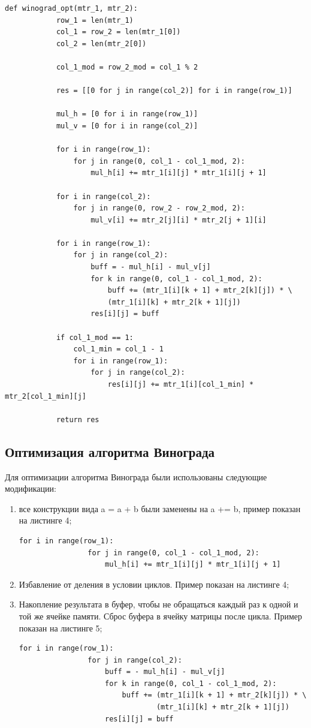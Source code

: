 \documentclass[a4paper, 14pt]{article}
\begin{document}
		\begin{lstlisting}[label=some-code,caption=Оптимизированный алгоритм Винограда]
		def winograd_opt(mtr_1, mtr_2):
    		row_1 = len(mtr_1)
    		col_1 = row_2 = len(mtr_1[0])
    		col_2 = len(mtr_2[0])

    		col_1_mod = row_2_mod = col_1 % 2

    		res = [[0 for j in range(col_2)] for i in range(row_1)]

    		mul_h = [0 for i in range(row_1)]
    		mul_v = [0 for i in range(col_2)]

    		for i in range(row_1):
        		for j in range(0, col_1 - col_1_mod, 2):
            		mul_h[i] += mtr_1[i][j] * mtr_1[i][j + 1]

    		for i in range(col_2):
        		for j in range(0, row_2 - row_2_mod, 2):
            		mul_v[i] += mtr_2[j][i] * mtr_2[j + 1][i]

    		for i in range(row_1):
        		for j in range(col_2):
            		buff = - mul_h[i] - mul_v[j]
            		for k in range(0, col_1 - col_1_mod, 2):
                		buff += (mtr_1[i][k + 1] + mtr_2[k][j]) * \
                        (mtr_1[i][k] + mtr_2[k + 1][j])
            		res[i][j] = buff

    		if col_1_mod == 1:
        		col_1_min = col_1 - 1
        		for i in range(row_1):
            		for j in range(col_2):
                		res[i][j] += mtr_1[i][col_1_min] * mtr_2[col_1_min][j]

    		return res
		\end{lstlisting}
        \subsection{Оптимизация алгоритма Винограда}
        \parindent=1cm
        Для оптимизации алгоритма Винограда были использованы следующие модификации:
        \begin{enumerate}
        	\item все конструкции вида a = a + b были заменены на a += b, пример показан на листинге 4;
		\begin{lstlisting}[label=some-code,caption=Оптимизация 1 и 2]
			for i in range(row_1):
        		for j in range(0, col_1 - col_1_mod, 2):
            		mul_h[i] += mtr_1[i][j] * mtr_1[i][j + 1]
		\end{lstlisting}   
			\item Избавление от деления в условии циклов. Пример показан на листинге 4; 
			\item Накопление результата в буфер, чтобы не обращаться каждый раз к одной и той же ячейке памяти. Сброс буфера в ячейку матрицы после цикла. Пример показан на листинге 5;   
			\begin{lstlisting}[label=some-code,caption=Оптимизация 3]
			for i in range(row_1):
        		for j in range(col_2):
            		buff = - mul_h[i] - mul_v[j]
            		for k in range(0, col_1 - col_1_mod, 2):
                		buff += (mtr_1[i][k + 1] + mtr_2[k][j]) * \
                        		(mtr_1[i][k] + mtr_2[k + 1][j])
            		res[i][j] = buff
		\end{lstlisting}   	
        \end{enumerate}
\end{document}
